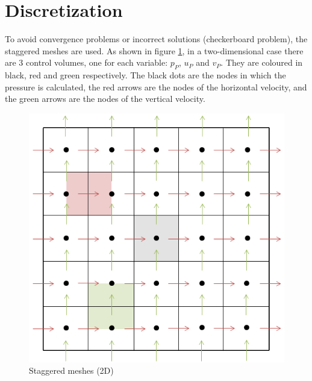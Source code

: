 \section{Discretization}
\label{FSMDiscretization}
To avoid convergence problems or incorrect solutions (checkerboard problem), the staggered meshes are used. As shown in figure \ref{staggered}, in a two-dimensional case there are 3 control volumes, one for each variable: $p_{P}$, $u_{P}$ and $v_{P}$. They are coloured in black, red and green respectively. The black dots are the nodes in which the pressure is calculated, the red arrows are the nodes of the horizontal velocity, and the green arrows are the nodes of the vertical velocity.
\begin{figure}
	\centering
	\includegraphics[scale=0.65]{DrivenCavity/staggered}
	\caption{Staggered meshes (2D)}
	\label{staggered}
\end{figure}

